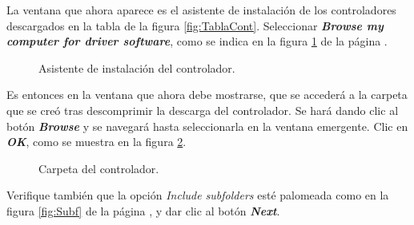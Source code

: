 La ventana que ahora aparece es el asistente de instalación de los controladores descargados en la tabla de la figura \ref{fig:TablaCont}. Seleccionar \textit{\textbf{Browse my computer for driver software}}, como se indica en la figura \ref{fig:Asis} de la página \pageref{fig:Asis}.

\begin{figure}[H] %
\caption{Asistente de instalación del controlador.}
\label{fig:Asis}
\end{figure}

Es entonces en la ventana que ahora debe mostrarse, que se accederá a la carpeta que se creó tras descomprimir la descarga del controlador. Se hará dando clic al botón \textbf{\textit{Browse}} y se navegará hasta seleccionarla en la ventana emergente. Clic en \textit{\textbf{OK}}, como se muestra en la figura \ref{fig:Asis2}.  

\begin{figure}[H] %
\caption{Carpeta del controlador.}
\label{fig:Asis2}
\end{figure}

Verifique también que la opción \textit{Include subfolders} esté palomeada como en la figura \ref{fig:Subf} de la página \pageref{fig:Subf}, y dar clic al botón \textit{\textbf{Next}}. 

